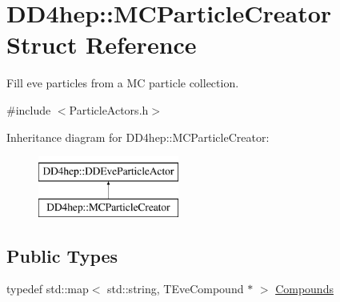 \hypertarget{struct_d_d4hep_1_1_m_c_particle_creator}{}\section{D\+D4hep\+:\+:M\+C\+Particle\+Creator Struct Reference}
\label{struct_d_d4hep_1_1_m_c_particle_creator}


Fill eve particles from a MC particle collection.  




{\ttfamily \#include $<$Particle\+Actors.\+h$>$}

Inheritance diagram for D\+D4hep\+:\+:M\+C\+Particle\+Creator\+:\begin{figure}[H]
\begin{center}
\leavevmode
\includegraphics[height=2.000000cm]{struct_d_d4hep_1_1_m_c_particle_creator}
\end{center}
\end{figure}
\subsection*{Public Types}
\begin{DoxyCompactItemize}
\item 
typedef std\+::map$<$ std\+::string, T\+Eve\+Compound $\ast$ $>$ \hyperlink{struct_d_d4hep_1_1_m_c_particle_creator_a803ff0bb27e3c5cd40daf4d253eb2b62}{Compounds}
\end{DoxyCompactItemize}

